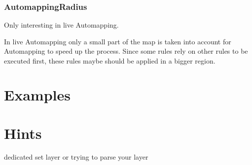 \documentclass[dvips, a4paper, 12pt,listof=totoc, oneside, parskip]{scrbook}
\begin{document}
\subsection{AutomappingRadius}
Only interesting in live Automapping.

In live Automapping only a small part of the map is taken into account for Automapping to speed
up the process.
Since some rules rely on other rules to be executed first, these rules maybe should be
applied in a bigger region.

\chapter{Examples}







\chapter{Hints}

dedicated set layer or trying to parse your layer
\end{document}
